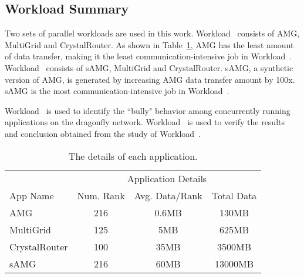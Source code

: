 \subsection{Workload Summary}
\label{sec:workload summary}

Two sets of parallel workloads are used in this work. Workload~ consists of AMG, MultiGrid and CrystalRouter. As shown in Table~\ref{tab:apps-detail}, AMG has the least amount of data transfer, making it the least communication-intensive job in Workload~. Workload~ consists of sAMG, MultiGrid and CrystalRouter. sAMG, a synthetic version of AMG, is generated by increasing AMG data transfer amount by 100x. sAMG is the most communication-intensive job in Workload~. 

Workload~ is used to identify the ``bully" behavior among concurrently running applications on the dragonfly network. Workload~ is used to verify the results and conclusion obtained from the study of Workload~.


\begin{table}[ht]
\begin{center}
\caption{The details of each application.} 
\label{tab:apps-detail}
\begin{tabular}{l c c c }
\toprule %
\toprule
&\multicolumn{3}{c}{Application Details} \\ 
\cmidrule(l){2-4}
App Name & Num. Rank & Avg. Data/Rank & Total Data\\ %
\midrule %
AMG  &    216 &   0.6MB   &     130MB\\ %
\midrule
MultiGrid  &    125 &   5MB   &     625MB\\ 
\midrule
CrystalRouter  &   100  &  35MB    &     3500MB\\ 
\midrule
sAMG  &    216 &   60MB   &     13000MB\\ %
\midrule %
\bottomrule %
\end{tabular}
\end{center}
\end{table}

